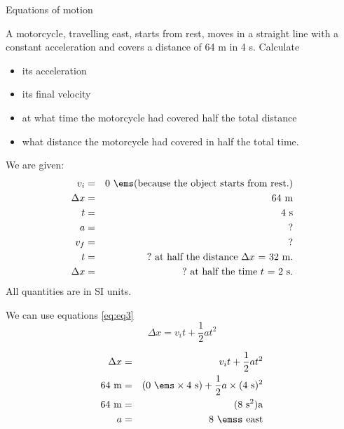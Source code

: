 \pagebreak[4]
\begin{wex}
{Equations of motion}{A motorcycle, travelling east, starts from rest, moves in a straight line with a constant acceleration and covers a distance of 64 m in 4 s. Calculate
\begin{itemize}
\item its acceleration
\item its final velocity
\item at what time the motorcycle had covered half the total distance
\item what distance the motorcycle had covered in half the total time.
\end{itemize}}
{
We are given:
\begin{eqnarray*}
v_i&=&0\ \ems \mbox{(because the object starts from rest.)}\\
\Delta x&=&64\ \mathrm{m}\\
t&=&4\ \mathrm{s}\\
a&=&?\\
v_f&=&?\\
t&=&?\ \mbox{at half the distance $\Delta x$~=~32~m.}\\
\Delta x&=&?\ \mbox{at half the time $t$~=~2~s.}
\end{eqnarray*}
All quantities are in SI units.

We can use equations \ref{eq:eq3}
\begin{displaymath}
\Delta x = v_it +\frac{1}{2}at^2
\end{displaymath}

\begin{eqnarray*}
\Delta x &=& v_it +\frac{1}{2}at^2\\
64\ \mathrm{m} &=& (0\ \ems \times 4\ \mathrm{s}) + \frac{1}{2} a \times (4\ \mathrm{s})^2\\
64\ \mathrm{m} &=& (8\ \mathrm{s}^2) \rm{a}\\
a &=&8\ \emss~\rm{east}
\end{eqnarray*}

}
\end{wex}

